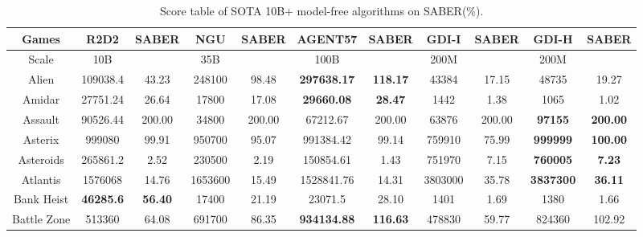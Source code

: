 \documentclass[nohyperref]{article}
\theoremstyle{plain}
\begin{document}
\begin{table}[!hb]
\footnotesize
\begin{center}
\caption{Score table of SOTA  10B+ model-free algorithms on SABER(\%).}
\label{Tab:Score table of SOTA  10B+ model-free algorithms on SABER.}
\setlength{\tabcolsep}{1.0pt}
\begin{tabular}{ |c| c c| c c| c c| c c| c c| }
\hline
 Games & R2D2 & SABER & NGU & SABER & AGENT57 & SABER & GDI-I & SABER & GDI-H & SABER\\
\hline
Scale  & 10B   &        & 35B &         & 100B     &        & 200M & &  200M   & \\
\hline
 Alien              & 109038.4          & 43.23             & 248100          & 98.48          & \textbf{297638.17}   &\textbf{118.17}           &43384             &17.15              &48735  &19.27        \\
 Amidar             & 27751.24          & 26.64             & 17800           & 17.08          & \textbf{29660.08}    &\textbf{28.47}            &1442              &1.38               &1065              &1.02     \\
 Assault            & 90526.44          & 200.00            & 34800           & 200.00         & 67212.67             &200.00                    &63876             &200.00             &\textbf{97155}     &\textbf{ 200.00}  \\
 Asterix            & 999080            & 99.91             & 950700          & 95.07          & 991384.42            &99.14                     &759910            &75.99              &\textbf{999999}     &\textbf{100.00}\\
 Asteroids          & 265861.2          & 2.52              & 230500          & 2.19           & 150854.61            &1.43                      &751970            &7.15               &\textbf{760005}     &\textbf{7.23}    \\
 Atlantis           & 1576068           & 14.76             & 1653600         & 15.49          & 1528841.76           &14.31                     &3803000           &35.78              &\textbf{3837300}    &\textbf{36.11}            \\
 Bank Heist         & \textbf{46285.6}  & \textbf{56.40}    & 17400           & 21.19          & 23071.5              &28.10                     &1401              &1.69               &1380       &1.66\\
 Battle Zone        & 513360            & 64.08             & 691700          & 86.35          & \textbf{934134.88}   &\textbf{116.63}           &478830            &59.77              &824360     &102.92  \\

\end{tabular}
\end{center}
\end{table}
\end{document}
